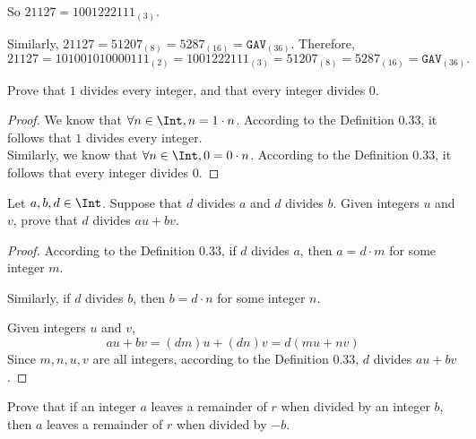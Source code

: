 \begin{solutions*}
So $21127 = 1001222111_{(3)}$.

Similarly, $21127 = 51207_{(8)} = 5287_{(16)} = \mathtt{GAV}_{(36)}$. Therefore,
\[
21127 = 101001010000111_{(2)} = 1001222111_{(3)} = 51207_{(8)} = 5287_{(16)} = \mathtt{GAV}_{(36)}.
\]
\end{solutions*}


\begin{exercise}
\label{exOneDividesEveryIntegerDividesZero}
Prove that $1$ divides every integer, and that every integer divides $0$.
\end{exercise}

\begin{solutions*}
  \fixlistskip
  \begin{proof}
    We know that $\forall n \in \Int, n = 1 \cdot n$.
    According to the Definition 0.33, it follows that $1$ divides every integer.\\

    Similarly, we know that $\forall n \in \Int, 0 = 0 \cdot n$.
    According to the Definition 0.33, it follows that every integer divides $0$.
  \end{proof}
\end{solutions*}

\begin{exercise}
\label{exDivisibilityIsLinear}
Let $a,b,d \in \Int$. Suppose that $d$ divides $a$ and $d$ divides $b$. Given integers $u$ and $v$, prove that $d$ divides $au+bv$.
\end{exercise}

\begin{solutions*}
  \fixlistskip
  \begin{proof}
    According to the Definition 0.33, if $d$ divides $a$, then $a = d \cdot m$ for some integer $m$.

    Similarly, if $d$ divides $b$, then $b = d \cdot n$ for some integer $n$.
    
    Given integers $u$ and $v$, 
    \[au+bv = (dm)u+(dn)v = d(mu+nv)\]
    Since $m,n,u,v$ are all integers, according to the Definition 0.33, $d$ divides $au+bv$.
  \end{proof}
\end{solutions*}


\begin{exercise}
Prove that if an integer $a$ leaves a remainder of $r$ when divided by an integer $b$, then $a$ leaves a remainder of $r$ when divided by $-b$.
\end{exercise}


